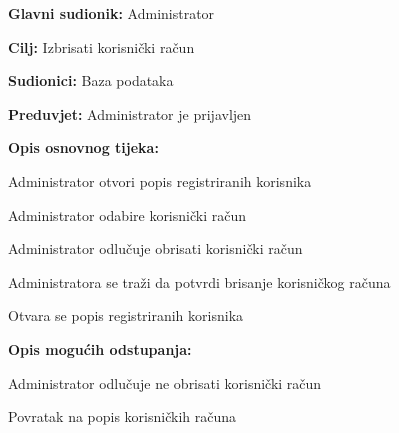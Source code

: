 					\noindent {}
					\begin{packed_item}
						
						\item \textbf{Glavni sudionik: }Administrator
						\item  \textbf{Cilj:} Izbrisati korisnički račun
						\item  \textbf{Sudionici:} Baza podataka
						\item  \textbf{Preduvjet:} Administrator je prijavljen
						\item  \textbf{Opis osnovnog tijeka:}
						
						\item[] \begin{packed_enum}
							
							\item Administrator otvori popis registriranih korisnika
							\item Administrator odabire korisnički račun
							\item Administrator odlučuje obrisati korisnički račun
							\item Administratora se traži da potvrdi brisanje korisničkog računa
							\item Otvara se popis registriranih korisnika
						\end{packed_enum}
						
						\item  \textbf{Opis mogućih odstupanja:}
					
						\item[] \begin{packed_item}
							
							\item[4.a] Administrator odlučuje ne obrisati korisnički račun
							\item[] \begin{packed_enum}			
								\item Povratak na popis korisničkih računa
							\end{packed_enum}
						\end{packed_item}
					\end{packed_item}
					
